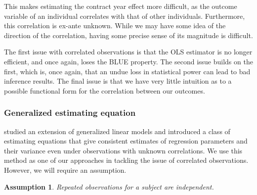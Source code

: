 \documentclass[12pt]{article}
\newtheorem{assumption}{Assumption}
\begin{document}
	This makes estimating the contract year effect more difficult, as the outcome variable of an individual correlates with that of other individuals. Furthermore, this correlation is ex-ante unknown. While we may have some idea of the direction of the correlation, having some precise sense of its magnitude is difficult.
	
	The first issue with correlated observations is that the OLS estimator is no longer efficient, and once again, loses the BLUE property. The second issue builds on the first, which is, once again, that an undue loss in statistical power can lead to bad inference results. The final issue is that we have very little intuition as to a possible functional form for the correlation between our outcomes.
	
	\subsubsection{Generalized estimating equation}
	
	\cite{liang_longitudinal_1986} studied an extension of generalized linear models and introduced a class of estimating equations that give consistent estimates of regression parameters and their variance even under observations with unknown correlations. We use this method as one of our approaches in tackling the issue of correlated observations. However, we will require an assumption.
	
	\begin{assumption}
		Repeated observations for a subject are independent.
	\end{assumption}
\end{document}
